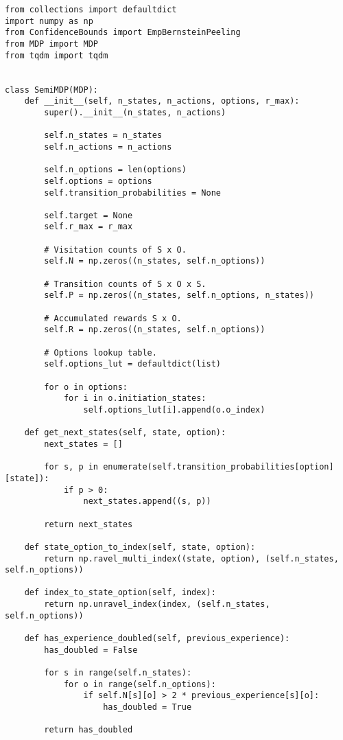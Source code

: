 \begin{verbatim}
from collections import defaultdict
import numpy as np
from ConfidenceBounds import EmpBernsteinPeeling
from MDP import MDP
from tqdm import tqdm


class SemiMDP(MDP):
    def __init__(self, n_states, n_actions, options, r_max):
        super().__init__(n_states, n_actions)

        self.n_states = n_states
        self.n_actions = n_actions

        self.n_options = len(options)
        self.options = options
        self.transition_probabilities = None

        self.target = None
        self.r_max = r_max

        # Visitation counts of S x O.
        self.N = np.zeros((n_states, self.n_options))

        # Transition counts of S x O x S.
        self.P = np.zeros((n_states, self.n_options, n_states))

        # Accumulated rewards S x O.
        self.R = np.zeros((n_states, self.n_options))

        # Options lookup table.
        self.options_lut = defaultdict(list)

        for o in options:
            for i in o.initiation_states:
                self.options_lut[i].append(o.o_index)

    def get_next_states(self, state, option):
        next_states = []

        for s, p in enumerate(self.transition_probabilities[option][state]):
            if p > 0:
                next_states.append((s, p))

        return next_states

    def state_option_to_index(self, state, option):
        return np.ravel_multi_index((state, option), (self.n_states, self.n_options))

    def index_to_state_option(self, index):
        return np.unravel_index(index, (self.n_states, self.n_options))

    def has_experience_doubled(self, previous_experience):
        has_doubled = False

        for s in range(self.n_states):
            for o in range(self.n_options):
                if self.N[s][o] > 2 * previous_experience[s][o]:
                    has_doubled = True

        return has_doubled


\end{verbatim}
